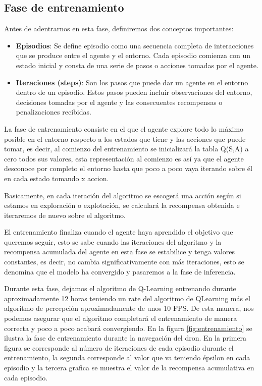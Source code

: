 \subsection{Fase de entrenamiento}
\label{sec:fases_ql}
 Antes de adentrarnos en esta fase, definiremos dos conceptos importantes:
 \begin{itemize}
  \item \textbf{Episodios}: Se define episodio como una secuencia completa de interacciones que se produce entre el agente y el entorno. Cada episodio comienza con un estado inicial y consta de una serie 
  de pasos o acciones tomadas por el agente.
  \item \textbf{Iteraciones (steps)}: Son los pasos que puede dar un agente en el entorno dentro de un episodio. Estos pasos pueden incluir observaciones del entorno, decisiones tomadas por el agente
  y las consecuentes recompensas o penalizaciones recibidas.
\end{itemize}

 
 La fase de entrenamiento consiste en el que el agente explore todo lo máximo posible en el entorno respecto a los estados que tiene y las acciones que puede tomar, es decir, al comienzo del entrenamiento se inicializará la tabla Q(S,A) a cero todos sus valores, esta representación
 al comienzo es así ya que el agente desconoce por completo el entorno hasta que poco a poco vaya iterando sobre él en cada estado tomando x accion. \newline
 
 Basicamente, en cada iteración del algoritmo se escogerá una acción según si estamos en exploración o explotación, se calculará la recompensa obtenida e iteraremos de nuevo sobre el algoritmo.

 El entrenamiento finaliza cuando el agente haya aprendido el objetivo que queremos seguir, esto se sabe cuando las iteraciones del algoritmo y la recompensa acumulada del agente en esta 
 fase se estabilice y tenga valores constantes, es decir, no cambia significativamente con más iteraciones, esto se denomina que el modelo ha convergido y pasaremos a la fase de inferencia. \newline

Durante esta fase, dejamos el algoritmo de Q-Learning entrenando durante aproximadamente 12 horas teniendo un rate del algoritmo de QLearning más el algoritmo de percepción aproximadamente de 
unos 10 FPS. De esta manera, nos podemos asegurar que el algoritmo completará el entrenamiento de manera correcta y poco a poco 
acabará convergiendo. 
En la fígura \ref{fig:entrenamiento} se ilustra la fase de entrenamiento durante la navegación del dron. En la primera figura se corresponde al número de iteraciones de cada 
episodio durante el entrenamiento, la segunda corresponde al valor que va teniendo épsilon en cada episodio y la tercera grafica se muestra el valor de la recompensa 
acumulativa en cada episodio. \newline


